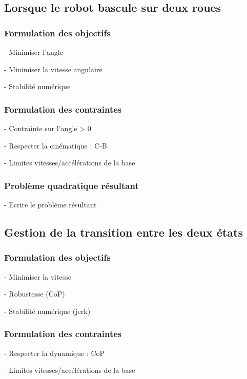 		\subsection{Lorsque le robot bascule sur deux roues}
			\label{section.mpc_deux_roues}
			\subsubsection{Formulation des objectifs}
		
				- Minimiser l'angle

				- Minimiser la vitesse angulaire

				- Stabilité numérique

			\subsubsection{Formulation des contraintes}

				- Contrainte sur l'angle > 0

				- Respecter la cinématique : C-B

				- Limites vitesses/accélérations de la base

			\subsubsection{Problème quadratique résultant}
		
				- Ecrire le problème résultant

		\subsection{Gestion de la transition entre les deux états}
			\subsubsection{Formulation des objectifs}

				- Minimiser la vitesse

				- Robustesse (CoP)

				- Stabilité numérique (jerk)

			\subsubsection{Formulation des contraintes}

				- Respecter la dynamique : CoP

				- Limites vitesses/accélérations de la base

